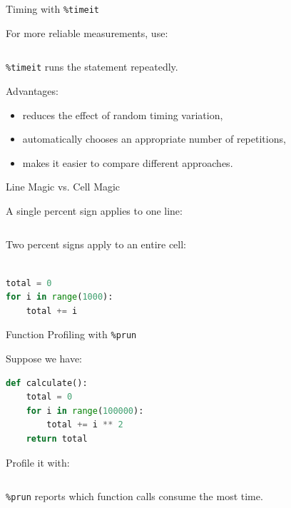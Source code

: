 \documentclass[aspectratio=43]{beamer}
\begin{document}
\begin{frame}[fragile]{Timing with \texttt{\%timeit}}

For more reliable measurements, use:

\begin{lstlisting}[language=Python]
%timeit sum(range(1000000))
\end{lstlisting}

\texttt{\%timeit} runs the statement repeatedly.

\vspace{0.3cm}

Advantages:

\begin{itemize}
  \item reduces the effect of random timing variation,
  \item automatically chooses an appropriate number of repetitions,
  \item makes it easier to compare different approaches.
\end{itemize}

\end{frame}

\begin{frame}[fragile]{Line Magic vs. Cell Magic}

A single percent sign applies to one line:

\begin{lstlisting}[language=Python]
%timeit sum(range(1000))
\end{lstlisting}

Two percent signs apply to an entire cell:

\begin{lstlisting}[language=Python]
%%timeit

total = 0
for i in range(1000):
    total += i
\end{lstlisting}

\end{frame}

\begin{frame}[fragile]{Function Profiling with \texttt{\%prun}}

Suppose we have:

\begin{lstlisting}[language=Python]
def calculate():
    total = 0
    for i in range(100000):
        total += i ** 2
    return total
\end{lstlisting}

Profile it with:

\begin{lstlisting}[language=Python]
%prun calculate()
\end{lstlisting}

\texttt{\%prun} reports which function calls consume the most time.

\end{frame}
\end{document}
